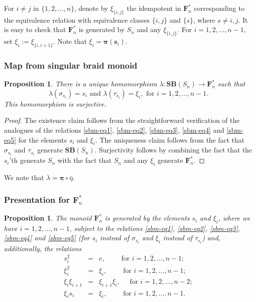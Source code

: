 \documentclass[a4paper]{amsart}
\newtheorem{proposition}[theorem]{Proposition}
\begin{document}
For $i\neq j$ in $\{1,2,\dots,n\}$, denote by $\xi_{\{i,j\}}$ the idempotent
in $\mathbf{F}^*_n$ corresponding to the equivalence relation
with equivalence classes $\{i,j\}$ and $\{s\}$, where $s\neq i,j$.
It is easy to check that $\mathbf{F}^*_n$ is generated by $S_n$
and any $\xi_{\{i,j\}}$. For $i=1,2,\dots,n-1$, set $\xi_i:=\xi_{\{i,i+1\}}$.
Note that $\xi_{i}=\boldsymbol{\pi}(\mathbf{s}_i)$.

\subsubsection{Map from singular braid monoid}\label{s4.3.2}

\begin{proposition}\label{prop-4.3.2-1}
There is a unique homomorphism $\lambda:\mathbf{SB}(S_n)\to\mathbf{F}^*_n$ such that
\begin{displaymath}
\lambda(\sigma_{s_i})=s_i\text{ and }
\lambda(\tau_{s_i})=\xi_{i},\text{ for }i=1,2,\dots,n-1.
\end{displaymath}
This homomorphism is surjective.
\end{proposition}

\begin{proof}
The existence claim follows from the straightforward verification of the 
analogues  of the relations \eqref{sbm-eq1}, \eqref{sbm-eq2}, \eqref{sbm-eq3}, 
\eqref{sbm-eq4} and \eqref{sbm-eq5} for the elements $s_i$ and $\xi_{i}$.
The uniqueness claim follows from the fact that $\sigma_{s_i}$ and $\tau_{s_i}$
generate $\mathbf{SB}(S_n)$. Surjectivity follows by combining the fact that 
the $s_i$'th generate $S_n$ with the fact that $S_n$ and any $\xi_{i}$
generate $\mathbf{F}^*_n$.
\end{proof}

We note that $\lambda=\boldsymbol{\pi}\circ\overline{\eta}$.

\subsubsection{Presentation for $\mathbf{F}^*_n$}\label{s4.3.3}

\begin{proposition}\label{prop-4.3.3-1}
The monoid $\mathbf{F}^*_n$ is generated by the elements 
$s_i$ and $\xi_{i}$, where we have  $i=1,2,\dots,n-1$, subject to the relations
\eqref{sbm-eq1}, \eqref{sbm-eq2}, \eqref{sbm-eq3}, \eqref{sbm-eq4} and \eqref{sbm-eq5}
(for $s_i$  instead of $\sigma_{s_i}$ and $\xi_{i}$ instead  of $\tau_{s_i}$)
and,  additionally, the relations
\begin{eqnarray}
s_i^2&=&e,\quad \quad \text{ for } i=1,2,\dots,n-1; \label{prop-4.3.3-1.1}\\
\xi_{i}^2&=&\xi_{i},\quad \quad  \text{ for } i=1,2,\dots,n-1;\label{prop-4.3.3-1.2}\\
\xi_{i}\xi_{i+1}&=&\xi_{i+1}\xi_{i}, \quad 
\text{ for } i=1,2,\dots,n-2; \label{prop-4.3.3-1.3}\\
\xi_{i}s_i&=&\xi_{i},\quad \quad  \text{ for } i=1,2,\dots,n-1. \label{prop-4.3.3-1.4}
\end{eqnarray}
\end{proposition}
\end{document}
